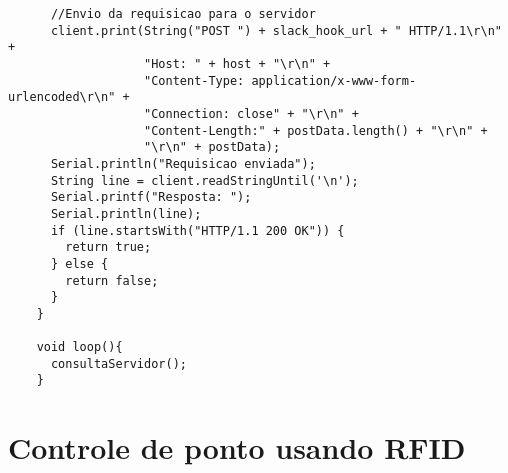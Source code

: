 \documentclass[
	11pt,				%
	openright,			%
	twoside,			%
	a5paper,			%
	english,			%
	french,				%
	spanish,			%
	brazil,				%
	sumario=tradicional
]{abntex2}
\begin{document}
\begin{lstlisting}
      //Envio da requisicao para o servidor
      client.print(String("POST ") + slack_hook_url + " HTTP/1.1\r\n" +
                   "Host: " + host + "\r\n" +
                   "Content-Type: application/x-www-form-urlencoded\r\n" +
                   "Connection: close" + "\r\n" +
                   "Content-Length:" + postData.length() + "\r\n" +
                   "\r\n" + postData);
      Serial.println("Requisicao enviada");
      String line = client.readStringUntil('\n');
      Serial.printf("Resposta: ");
      Serial.println(line);
      if (line.startsWith("HTTP/1.1 200 OK")) {
        return true;
      } else {
        return false;
      }
    }
    
    void loop(){
      consultaServidor();
    }

\end{lstlisting}

\newpage

\section{Controle de ponto usando RFID}
\end{document}
